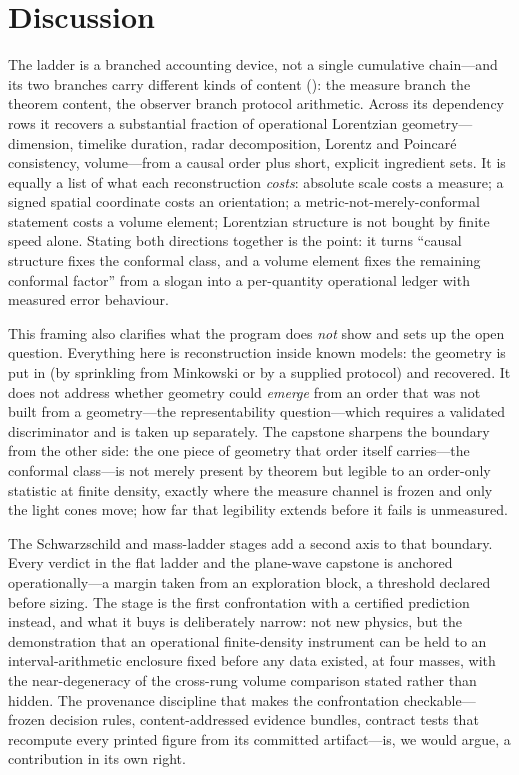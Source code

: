 \section{Discussion}\label{sec:discussion}

The ladder is a branched accounting device, not a single cumulative
chain---and its two branches carry different kinds of content
(): the measure branch the theorem content, the observer
branch protocol arithmetic. Across its dependency rows it recovers a substantial fraction of operational
Lorentzian geometry---dimension, timelike duration, radar decomposition,
Lorentz and Poincar\'e consistency, volume---from a causal order plus short,
explicit ingredient sets. It is equally a list of what each reconstruction
\emph{costs}: absolute scale costs a measure; a signed spatial coordinate
costs an orientation; a metric-not-merely-conformal statement costs a volume
element; Lorentzian structure is not bought by finite speed alone. Stating
both directions together is the point: it turns ``causal structure fixes the
conformal class, and a volume element fixes the remaining conformal factor''
from a slogan into a per-quantity operational ledger with measured error
behaviour.

This framing also clarifies what the program does \emph{not} show and sets up
the open question. Everything here is reconstruction inside known models: the
geometry is put in (by sprinkling from Minkowski or by a supplied protocol)
and recovered. It does not address whether geometry could \emph{emerge} from
an order that was not built from a geometry---the representability
question---which requires a validated discriminator and is taken up
separately. The  capstone sharpens the boundary from the
other side: the one piece of geometry that order itself carries---the
conformal class---is not merely present by theorem but legible to an order-only statistic at
finite density, exactly where the measure channel is frozen and only the
light cones move; how far that legibility extends before it fails is
unmeasured.

The Schwarzschild and mass-ladder stages add a second axis to that boundary.
Every verdict in the flat ladder and the plane-wave capstone is anchored
operationally---a margin taken from an exploration block, a threshold
declared before sizing. The  stage is the first
confrontation with a certified prediction instead, and what it buys is
deliberately narrow: not new physics, but the demonstration that an
operational finite-density instrument can be held to an interval-arithmetic
enclosure fixed before any data existed, at four masses, with the
near-degeneracy of the cross-rung volume comparison stated rather than
hidden. The provenance discipline that makes the confrontation
checkable---frozen decision rules, content-addressed evidence bundles,
contract tests that recompute every printed figure from its committed
artifact---is, we would argue, a contribution in its own right.

